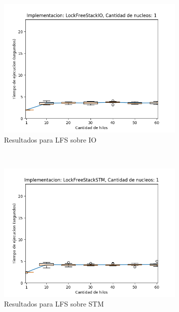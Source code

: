 \begin{appendices}
\begin{figure}[H]
    \begin{subfigure}[b]{0.49\textwidth}
        \includegraphics[width=\textwidth]{images/numberOfThreadsDist/plots/expLFSIO-1}
        \caption{Resultados para LFS sobre IO}
        \label{subfig:numberOfThreadsDist-lfsio-1}
    \end{subfigure}
    ~
    \begin{subfigure}[b]{0.49\textwidth}
        \includegraphics[width=\textwidth]{images/numberOfThreadsDist/plots/expLFSSTM-1}
        \caption{Resultados para LFS sobre STM}
        \label{subfig:numberOfThreadsDist-lfsstm-1}
    \end{subfigure}
    \begin{subfigure}[b]{0.49\textwidth}

\end{subfigure}
\end{figure}
\end{appendices}
